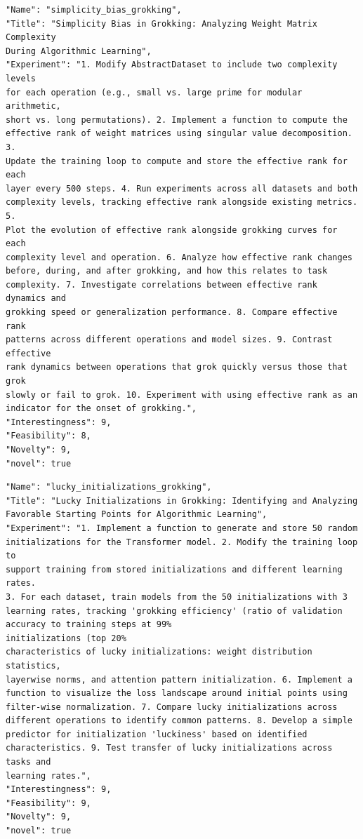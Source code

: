 \begin{tcolorbox}[breakable,colback=blue!5!white, colframe=blue!75!black, title=Idea 33/50 - \texttt{simplicity\_bias\_grokking}]
\small
\begin{verbatim}
"Name": "simplicity_bias_grokking",
"Title": "Simplicity Bias in Grokking: Analyzing Weight Matrix Complexity
During Algorithmic Learning",
"Experiment": "1. Modify AbstractDataset to include two complexity levels
for each operation (e.g., small vs. large prime for modular arithmetic,
short vs. long permutations). 2. Implement a function to compute the
effective rank of weight matrices using singular value decomposition. 3.
Update the training loop to compute and store the effective rank for each
layer every 500 steps. 4. Run experiments across all datasets and both
complexity levels, tracking effective rank alongside existing metrics. 5.
Plot the evolution of effective rank alongside grokking curves for each
complexity level and operation. 6. Analyze how effective rank changes
before, during, and after grokking, and how this relates to task
complexity. 7. Investigate correlations between effective rank dynamics and
grokking speed or generalization performance. 8. Compare effective rank
patterns across different operations and model sizes. 9. Contrast effective
rank dynamics between operations that grok quickly versus those that grok
slowly or fail to grok. 10. Experiment with using effective rank as an
indicator for the onset of grokking.",
"Interestingness": 9,
"Feasibility": 8,
"Novelty": 9,
"novel": true
\end{verbatim}
\end{tcolorbox}

\begin{tcolorbox}[breakable,colback=blue!5!white, colframe=blue!75!black, title=Idea 34/50 - \texttt{lucky\_initializations\_grokking}]
\small
\begin{verbatim}
"Name": "lucky_initializations_grokking",
"Title": "Lucky Initializations in Grokking: Identifying and Analyzing
Favorable Starting Points for Algorithmic Learning",
"Experiment": "1. Implement a function to generate and store 50 random
initializations for the Transformer model. 2. Modify the training loop to
support training from stored initializations and different learning rates.
3. For each dataset, train models from the 50 initializations with 3
learning rates, tracking 'grokking efficiency' (ratio of validation
accuracy to training steps at 99%
initializations (top 20%
characteristics of lucky initializations: weight distribution statistics,
layerwise norms, and attention pattern initialization. 6. Implement a
function to visualize the loss landscape around initial points using
filter-wise normalization. 7. Compare lucky initializations across
different operations to identify common patterns. 8. Develop a simple
predictor for initialization 'luckiness' based on identified
characteristics. 9. Test transfer of lucky initializations across tasks and
learning rates.",
"Interestingness": 9,
"Feasibility": 9,
"Novelty": 9,
"novel": true
\end{verbatim}
\end{tcolorbox}

